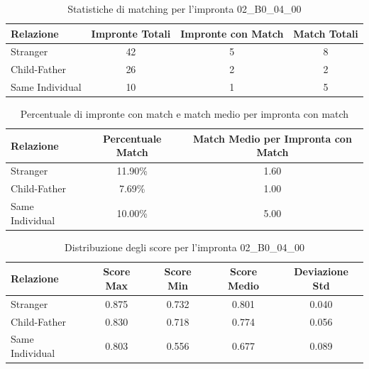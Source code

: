 \begin{table}[htbp]
\centering
\caption{Statistiche di matching per l'impronta 02\_B0\_04\_00}
\label{tab:results_02_B0_04_00}
\begin{tabular}{|l|c|c|c|}
\hline
\textbf{Relazione} & \textbf{Impronte Totali} & \textbf{Impronte con Match} & \textbf{Match Totali} \\
\hline
Stranger & 42 & 5 & 8 \\
\hline
Child-Father & 26 & 2 & 2 \\
\hline
Same Individual & 10 & 1 & 5 \\
\hline
\end{tabular}
\end{table}


\begin{table}[htbp]
\centering
\caption{Percentuale di impronte con match e match medio per impronta con match}
\label{tab:match_percentage_02_B0_04_00}
\begin{tabular}{|l|c|c|}
\hline
\textbf{Relazione} & \textbf{Percentuale Match} & \textbf{Match Medio per Impronta con Match} \\
\hline
Stranger & 11.90\% & 1.60 \\
\hline
Child-Father & 7.69\% & 1.00 \\
\hline
Same Individual & 10.00\% & 5.00 \\
\hline
\end{tabular}
\end{table}


\begin{table}[htbp]
\centering
\caption{Distribuzione degli score per l'impronta 02\_B0\_04\_00}
\label{tab:scores_02_B0_04_00}
\begin{tabular}{|l|c|c|c|c|}
\hline
\textbf{Relazione} & \textbf{Score Max} & \textbf{Score Min} & \textbf{Score Medio} & \textbf{Deviazione Std} \\
\hline
Stranger & 0.875 & 0.732 & 0.801 & 0.040 \\
\hline
Child-Father & 0.830 & 0.718 & 0.774 & 0.056 \\
\hline
Same Individual & 0.803 & 0.556 & 0.677 & 0.089 \\
\hline
\end{tabular}
\end{table}

